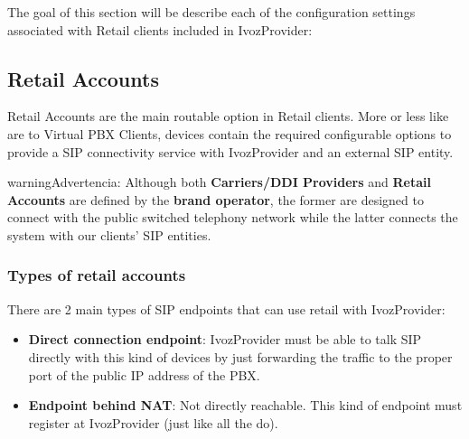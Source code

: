 \documentclass[letterpaper,10pt,spanish]{sphinxmanual}
\begin{document}
The goal of this section will be describe each of the configuration settings
associated with Retail clients included in IvozProvider:


\subsection{Retail Accounts}
\label{administration_portal/client/retail/retail_accounts::doc}\label{administration_portal/client/retail/retail_accounts:retail-accounts}\label{administration_portal/client/retail/retail_accounts:id1}
Retail Accounts are the main routable option in Retail clients.
More or less like {\hyperref[administration_portal/client/vpbx/routing_endpoints/friends/index:friends]{}} are to Virtual PBX Clients, devices
contain the required configurable options to provide a SIP connectivity
service with IvozProvider and an external SIP entity.

\begin{notice}{warning}{Advertencia:}
Although both \textbf{Carriers/DDI Providers} and \textbf{Retail Accounts} are defined by the
\textbf{brand operator}, the former are designed to connect with the public switched telephony network
while the latter connects the system with our clients' SIP entities.
\end{notice}


\subsubsection{Types of retail accounts}
\label{administration_portal/client/retail/retail_accounts:types-of-retail-accounts}
There are 2 main types of SIP endpoints that can use retail with IvozProvider:
\begin{itemize}
\item {} 
\textbf{Direct connection endpoint}: IvozProvider must be able to talk SIP directly with
this kind of devices by just forwarding the traffic to the proper port of
the public IP address of the PBX.

\item {} 
\textbf{Endpoint behind NAT}: Not directly reachable. This kind of endpoint must register at
IvozProvider (just like all the {\hyperref[administration_portal/client/vpbx/terminals:terminals]{}} do).

\end{itemize}
\end{document}
